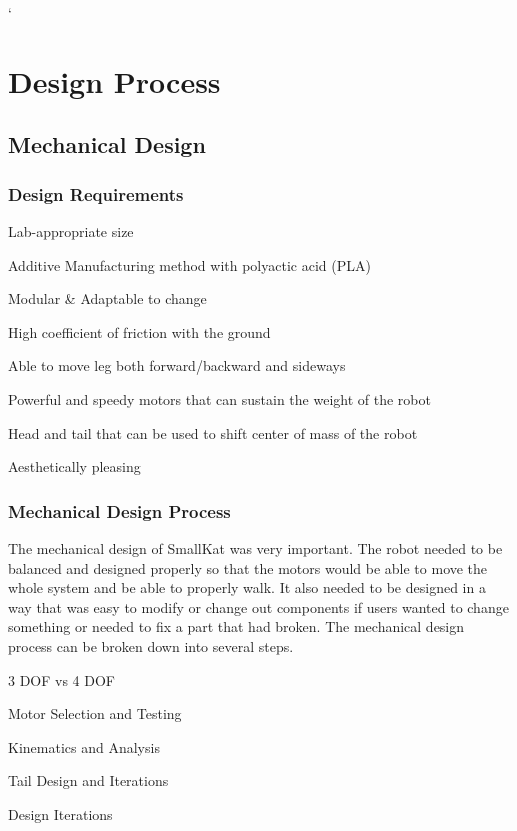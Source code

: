 `\section{Design Process} %


    \subsection{Mechanical Design} 

        \subsubsection{Design Requirements}
            \begin{Deliverables}
                \item Lab-appropriate size
                \item Additive Manufacturing method with polyactic acid (PLA)
                \item Modular \& Adaptable to change
                \item High coefficient of friction with the ground
                \item Able to move leg both forward/backward and sideways
                \item Powerful and speedy motors that can sustain the weight of the robot
                \item Head and tail that can be used to shift center of mass of the robot
                \item Aesthetically pleasing
            \end{Deliverables}
            
         \subsubsection{Mechanical Design Process}
            The mechanical design of SmallKat was very important. The robot needed to be balanced and designed properly so that the motors would be able to move the whole system and be able to properly walk. It also needed to be designed in a way that was easy to modify or change out components if users wanted to change something or needed to fix a part that had broken. The mechanical design process can be broken down into several steps. 
             \begin{Deliverables}
                \item 3 DOF vs 4 DOF
                \item Motor Selection and Testing
                \item Kinematics and Analysis
                \item Tail Design and Iterations
                \item Design Iterations
            \end{Deliverables}
      
